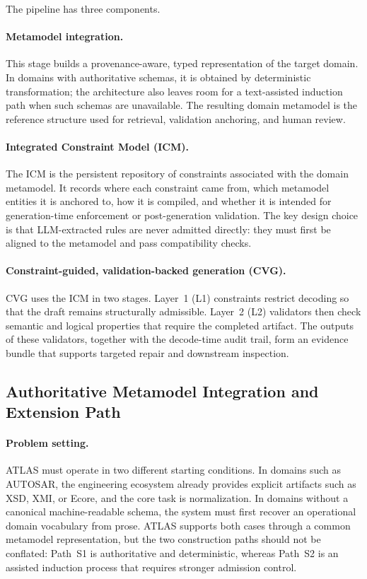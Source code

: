 \documentclass[acmlarge,nonacm]{acmart}
\theoremstyle{acmplain}
\theoremstyle{acmdefinition}
\begin{document}
The pipeline has three components.

\paragraph{Metamodel integration.} This stage builds a provenance-aware, typed representation of the target domain. In domains with authoritative schemas, it is obtained by deterministic transformation; the architecture also leaves room for a text-assisted induction path when such schemas are unavailable. The resulting domain metamodel is the reference structure used for retrieval, validation anchoring, and human review.

\paragraph{Integrated Constraint Model (ICM).} The ICM is the persistent repository of constraints associated with the domain metamodel. It records where each constraint came from, which metamodel entities it is anchored to, how it is compiled, and whether it is intended for generation-time enforcement or post-generation validation. The key design choice is that LLM-extracted rules are never admitted directly: they must first be aligned to the metamodel and pass compatibility checks.

\paragraph{Constraint-guided, validation-backed generation (CVG).} CVG uses the ICM in two stages. Layer~1 (L1) constraints restrict decoding so that the draft remains structurally admissible. Layer~2 (L2) validators then check semantic and logical properties that require the completed artifact. The outputs of these validators, together with the decode-time audit trail, form an evidence bundle that supports targeted repair and downstream inspection.


\subsection{Authoritative Metamodel Integration and Extension Path}
\label{sec:metamodel-integration}

\paragraph{Problem setting.}
ATLAS must operate in two different starting conditions. In domains such as AUTOSAR, the engineering ecosystem already provides explicit artifacts such as XSD, XMI, or Ecore, and the core task is normalization. In domains without a canonical machine-readable schema, the system must first recover an operational domain vocabulary from prose. ATLAS supports both cases through a common metamodel representation, but the two construction paths should not be conflated: Path~S1 is authoritative and deterministic, whereas Path~S2 is an assisted induction process that requires stronger admission control.
\end{document}
